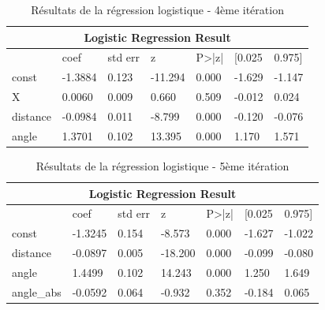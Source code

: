\documentclass[12pt]{article}
\begin{document}
\begin{table}[htp]
    \centering
    \begin{tabular}{lllllll}
    \multicolumn{7}{c}{\textbf{Logistic Regression Result}}                           \\ \hline
             & coef    & std err & z       & P\textgreater{}|z| & {[}0.025 & 0.975{]} \\ \hline
    const    & -1.3884 & 0.123   & -11.294 & 0.000              & -1.629   & -1.147   \\
    X        & 0.0060  & 0.009   & 0.660   & 0.509              & -0.012   & 0.024    \\
    distance & -0.0984 & 0.011   & -8.799  & 0.000              & -0.120   & -0.076   \\
    angle    & 1.3701  & 0.102   & 13.395  & 0.000              & 1.170    & 1.571    \\ \hline
    \end{tabular}
    \caption{Résultats de la régression logistique - 4ème itération}
    \label{tab:logistic_regression_result_4}
\end{table}

\begin{table}[htp]
    \centering
    \begin{tabular}{lllllll}
    \multicolumn{7}{c}{\textbf{Logistic Regression Result}}                             \\ \hline
               & coef    & std err & z       & P\textgreater{}|z| & {[}0.025 & 0.975{]} \\ \hline
    const      & -1.3245 & 0.154   & -8.573  & 0.000              & -1.627   & -1.022   \\
    distance   & -0.0897 & 0.005   & -18.200 & 0.000              & -0.099   & -0.080   \\
    angle      & 1.4499  & 0.102   & 14.243  & 0.000              & 1.250    & 1.649    \\
    angle\_abs & -0.0592 & 0.064   & -0.932  & 0.352              & -0.184   & 0.065    \\ \hline
    \end{tabular}
    \caption{Résultats de la régression logistique - 5ème itération}
    \label{tab:logistic_regression_result_5}
\end{table}
\end{document}
